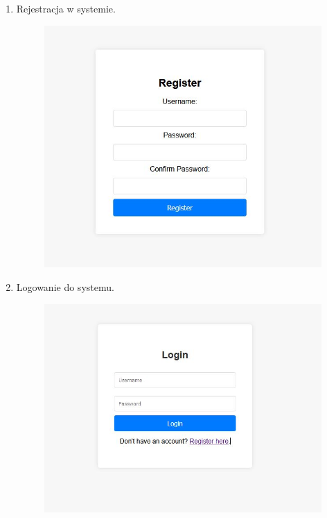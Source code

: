 \documentclass[12pt,a4paper,oneside]{article}
\theoremstyle{definition}
\numberwithin{equation}{section}
\begin{document}
\begin{enumerate}
  \item Rejestracja w systemie.
        \begin{figure}[H]
          \includegraphics[width=\linewidth]{dokumentacja_uzytkowa/images/register.JPG}
          \label{fig:Rejestracja}
        \end{figure}
        \newpage
  
  \item Logowanie do systemu.
        \begin{figure}[H]
          \includegraphics[width=\linewidth]{dokumentacja_uzytkowa/images/login.JPG}
          \label{fig:Logowanie}
        \end{figure}        


\end{enumerate}
\end{document}
